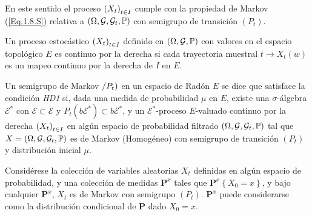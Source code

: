 En este sentido el proceso $\left(X_{t}\right)_{t\in I}$ cumple con la propiedad de Markov
(\ref{Eq.1.8.S}) relativa a
$\left(\Omega,\mathcal{G},\mathcal{G}_{t},\mathbb{P}\right)$ con
semigrupo de transici\'on $\left(P_{t}\right)$.



\begin{Def}
Un proceso estoc\'astico $\left(X_{t}\right)_{t\in I}$ definido en
$\left(\Omega,\mathcal{G},\mathbb{P}\right)$ con valores en el espacio
topol\'ogico $E$ es continuo por la derecha si cada trayectoria
muestral $t\rightarrow X_{t}\left(w\right)$ es un mapeo continuo
por la derecha de $I$ en $E$.
\end{Def}

\begin{Def}[HD1]\label{Eq.2.1.S}
Un semigrupo de Markov $\left/P_{t}\right)$ en un espacio de
Rad\'on $E$ se dice que satisface la condici\'on {\em HD1} si,
dada una medida de probabilidad $\mu$ en $E$, existe una
$\sigma$-\'algebra $\mathcal{E^{*}}$ con
$\mathcal{E}\subset\mathcal{E}$ y
$P_{t}\left(b\mathcal{E}^{*}\right)\subset b\mathcal{E}^{*}$, y un
$\mathcal{E}^{*}$-proceso $E$-valuado continuo por la derecha
$\left(X_{t}\right)_{t\in I}$ en alg\'un espacio de probabilidad filtrado
$\left(\Omega,\mathcal{G},\mathcal{G}_{t},\mathbb{P}\right)$ tal que
$X=\left(\Omega,\mathcal{G},\mathcal{G}_{t},\mathbb{P}\right)$ es de
Markov (Homog\'eneo) con semigrupo de transici\'on $(P_{t})$ y
distribuci\'on inicial $\mu$.
\end{Def}
Consid\'erese la colecci\'on de variables aleatorias $X_{t}$
definidas en alg\'un espacio de probabilidad, y una colecci\'on de
medidas $\mathbf{P}^{x}$ tales que
$\mathbf{P}^{x}\left\{X_{0}=x\right\}$, y bajo cualquier
$\mathbf{P}^{x}$, $X_{t}$ es de Markov con semigrupo
$\left(P_{t}\right)$. $\mathbf{P}^{x}$ puede considerarse como la
distribuci\'on condicional de $\mathbf{P}$ dado $X_{0}=x$.

